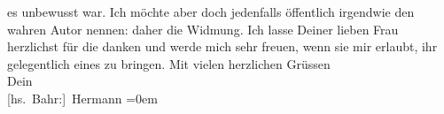 \begin{ledgroupsized}[t]{13cm}
               es unbewusst war. Ich möchte aber doch jedenfalls öffentlich irgendwie den wahren
               Autor nennen: daher die Widmung.\pend
           \pstart
           Ich lasse Deiner lieben Frau
               herzlichst für die \label{K_L01633_1v}\label{K_L01633_1h} danken und werde mich
               sehr freuen, wenn sie mir erlaubt, ihr gelegentlich eines zu bringen.\pend
           \pstart
           Mit vielen herzlichen Grüssen{\\[\baselineskip]}Dein{\\[\baselineskip]}\spacefill\mbox{{[}hs. Bahr:{]} Hermann}\pend
           \leftskip=0em{}          \endnumbering{}\end{ledgroupsized}  \newcommand{\dateiname}{L01633}\newcommand{\titel}{Hermann Bahr an Arthur Schnitzler, 16. 10. 1906}\newcommand{\editorInnen}{ Kurt Ifkovits,  Martin Anton Müller}
            \footnotesize
\begin{ledgroupsized}[t]{11.5cm}
\end{ledgroupsized}
         
      